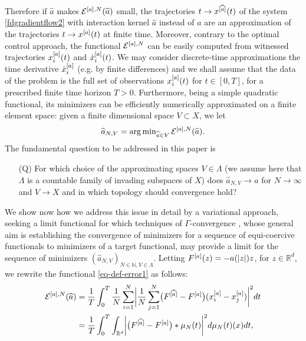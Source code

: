 Therefore if $\widehat a$ makes $\mathcal E^{[a],N}(\widehat a)$ small, the trajectories $t\to x^{[\widehat a]}(t)$ of the system \eqref{fdgradientflow2} with interaction kernel $\widehat a$ instead of $a$ are an approximation of the trajectories $t \to x^{[a]}(t)$ at finite time. 
Moreover, contrary to the optimal control approach, the functional $\mathcal E^{[a],N}$ can be easily computed from witnessed trajectories $x^{[a]}_i(t)$ and $\dot{x}^{[a]}_i(t)$. We may consider discrete-time approximations the time derivative $\dot{x}^{[a]}_i$ (e.g. by finite differences) and we shall assume that the data of the problem is the full set of observations $x^{[a]}_i(t)$ for $t \in [0,T]$, for a prescribed finite time horizon $T>0$. Furthermore, being a simple quadratic functional, its minimizers can be efficiently numerically approximated on a finite element space: given a finite dimensional space $V \subset X$, we let
\begin{equation}\label{fdproxy}
\widehat a_{N,V} = \operatorname{arg\,min}_{\widehat a \in V} \mathcal E^{[a],N}(\widehat a).
\end{equation}
The fundamental question to be addressed in this paper is
\begin{itemize}
\item[(Q)] For which choice of the approximating spaces $V \in \Lambda$ (we assume here that $\Lambda$ is a countable family of invading subspaces of $X$) does $\widehat a_{N,V} \to a$ for $N \to \infty$ and $V \to X$ and in which topology should convergence hold?
\end{itemize}
We show now how we address this issue in detail by a variational approach, seeking a limit functional for which techniques of $\Gamma$-convergence \cite{MR1201152}, whose general aim is establishing the convergence of minimizers for a sequence of equi-coercive functionals to minimizers of a target functional, may provide a limit for the sequence of minimizers $(\widehat a_{N,V})_{N \in \mathbb N, V \in \Lambda}$.
Letting $F^{[a]}(z) =-a(| z |)z$, for $z \in \mathbb R^{d}$, we rewrite the functional \eqref{eq-def-error1} as follows:
\begin{align}\label{pirlo}
	\begin{split}
	\mathcal E^{[a],N}(\widehat a) & = \frac{1}{T}\int_0^T\frac{1}{N}\sum_{i=1}^N\biggl|\frac{1}{N}\sum_{j=1}^N
			\bigl(F^{[\widehat a]}-F^{[a]}\bigr)(x^{[a]}_i-x^{[a]}_j)\biggr|^2 dt\\
			& = \frac{1}{T}\int_0^T \int_{\mathbb{R}^d} \biggl|\bigl(F^{[\widehat a]}-F^{[a]}\bigr)\ast\mu_N(t)\biggr|^2d\mu_N(t)(x)dt,
	\end{split}
\end{align}

